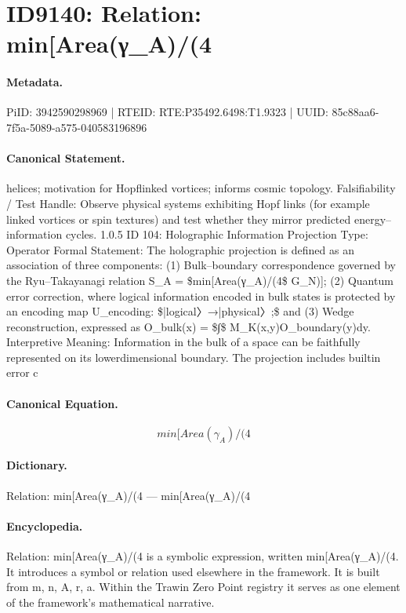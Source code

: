 \section*{ID9140: Relation: min[Area(γ\_A)/(4}
\paragraph{Metadata.}
PiID: 3942590298969 | RTEID: RTE:P35492.6498:T1.9323 | UUID: 85c88aa6-7f5a-5089-a575-040583196896

\paragraph{Canonical Statement.}
helices; motivation for Hopflinked vortices; informs cosmic topology. Falsifiability / Test Handle: Observe physical systems exhibiting Hopf links (for example linked vortices or spin textures) and test whether they mirror predicted energy–information cycles. 1.0.5 ID 104: Holographic Information Projection Type: Operator Formal Statement: The holographic projection is defined as an association of three components: (1) Bulk–boundary correspondence governed by the Ryu–Takayanagi relation S\_A = \$min[Area(γ\_A)/(4\$ G\_N)]; (2) Quantum error correction, where logical information encoded in bulk states is protected by an encoding map U\_encoding: \$|logical〉→|physical〉;\$ and (3) Wedge reconstruction, expressed as O\_bulk(x) = \$∫\$ M\_K(x,y)O\_boundary(y)dy. Interpretive Meaning: Information in the bulk of a space can be faithfully represented on its lowerdimensional boundary. The projection includes builtin error c

\paragraph{Canonical Equation.}
\[
min[Area(γ_A)/(4
\]

\paragraph{Dictionary.}
Relation: min[Area(γ\_A)/(4 — min[Area(γ\_A)/(4

\paragraph{Encyclopedia.}
Relation: min[Area(γ\_A)/(4 is a symbolic expression, written min[Area(γ\_A)/(4. It introduces a symbol or relation used elsewhere in the framework. It is built from m, n, A, r, a. Within the Trawin Zero Point registry it serves as one element of the framework's mathematical narrative.
